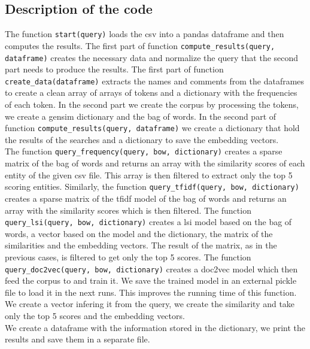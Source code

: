 \documentclass [14 pt]{article}
\begin{document}
\subsection{Description of the code} %
The function \texttt{start(query)} loads the csv into a pandas dataframe and then computes the results.
The first part of function \texttt{compute\_results(query, dataframe)} creates the necessary data and normalize the query that the second part needs to produce the results.
The first part of function \texttt{create\_data(dataframe)} extracts the names and comments from the dataframes to create a clean array of arrays of tokens and a dictionary with the frequencies of each token. In the second part we create the corpus by processing the tokens, we create a gensim dictionary and the bag of words. 
In the second part of function \texttt{compute\_results(query, dataframe)} we create a dictionary that hold the results of the searches and a dictionary to save the embedding vectors. \\
The function \texttt{query\_frequency(query, bow, dictionary)} creates a sparse matrix of the bag of words and returns an array with the similarity scores of each entity of the given csv file. This array is then filtered to extract only the top 5 scoring entities.
Similarly, the function \texttt{query\_tfidf(query, bow, dictionary)} creates a sparse matrix of the tfidf model of the bag of words and returns an array with the similarity scores which is then filtered.
The function \texttt{query\_lsi(query, bow, dictionary)} creates a lsi model based on the bag of words, a vector based on the model and the dictionary, the matrix of the similarities and the embedding vectors. The result of the matrix, as in the previous cases, is filtered to get only the top 5 scores.
The function \texttt{query\_doc2vec(query, bow, dictionary)} creates a doc2vec model which then feed the corpus to and train it. We save the trained model in an external pickle file to load it in the next runs. This improves the running time of this function.  We create a vector infering it from the query, we create the similarity and take only the top 5 scores and the embedding vectors.\\
We create a dataframe with the information stored in the dictionary, we print the results and save them in a separate file.
\end{document}
